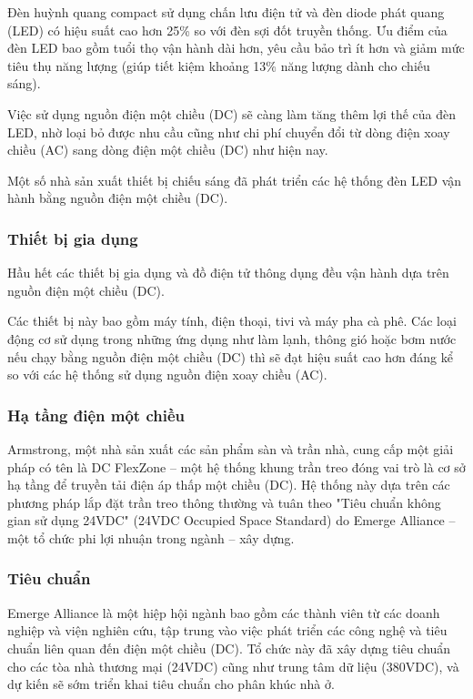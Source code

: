 \documentclass{thesis}
\begin{document}
Đèn huỳnh quang compact sử dụng chấn lưu điện tử và đèn diode phát
quang (LED) có hiệu suất cao hơn 25\% so với đèn sợi đốt truyền thống.
Ưu điểm của đèn LED bao gồm tuổi thọ vận hành dài hơn, yêu cầu bảo
trì ít hơn và giảm mức tiêu thụ năng lượng (giúp tiết kiệm khoảng
13\% năng lượng dành cho chiếu sáng).

Việc sử dụng nguồn điện một chiều (DC) sẽ càng làm tăng thêm lợi
thế của đèn LED, nhờ loại bỏ được nhu cầu cũng như chi phí chuyển
đổi từ dòng điện xoay chiều (AC) sang dòng điện một chiều (DC) như hiện nay.

Một số nhà sản xuất thiết bị chiếu sáng đã phát triển các hệ thống
đèn LED vận hành bằng nguồn điện một chiều (DC).

\subsubsection{Thiết bị gia dụng}

Hầu hết các thiết bị gia dụng và đồ điện tử thông dụng đều vận hành
dựa trên nguồn điện một chiều (DC).

Các thiết bị này bao gồm máy tính, điện thoại, tivi và máy pha cà
phê. Các loại động cơ sử dụng trong những ứng dụng như làm lạnh,
thông gió hoặc bơm nước nếu chạy bằng nguồn điện một chiều (DC) thì
sẽ đạt hiệu suất cao hơn đáng kể so với các hệ thống sử dụng nguồn
điện xoay chiều (AC).

\subsubsection{Hạ tầng điện một chiều}

Armstrong, một nhà sản xuất các sản phẩm sàn và trần nhà, cung cấp
một giải pháp có tên là DC FlexZone – một hệ thống khung trần treo
đóng vai trò là cơ sở hạ tầng để truyền tải điện áp thấp một chiều
(DC). Hệ thống này dựa trên các phương pháp lắp đặt trần treo thông
thường và tuân theo "Tiêu chuẩn không gian sử dụng 24VDC" (24VDC
Occupied Space Standard) do Emerge Alliance – một tổ chức phi lợi
nhuận trong ngành – xây dựng.

\subsubsection{Tiêu chuẩn}

Emerge Alliance là một hiệp hội ngành bao gồm các thành viên từ các
doanh nghiệp và viện nghiên cứu, tập trung vào việc phát triển các
công nghệ và tiêu chuẩn liên quan đến điện một chiều (DC). Tổ chức
này đã xây dựng tiêu chuẩn cho các tòa nhà thương mại (24VDC) cũng
như trung tâm dữ liệu (380VDC), và dự kiến sẽ sớm triển khai tiêu
chuẩn cho phân khúc nhà ở.
\end{document}
